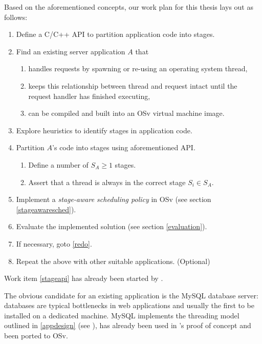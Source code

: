 \documentclass{article}
\begin{document}
Based on the aforementioned concepts, our work plan for this thesis lays out as follows:

\begin{enumerate}
    \item \label{stageapi} Define a C/C++ API to partition application code into stages.
    \item \label{appdesign} Find an existing server application $A$ that
    \begin{enumerate}
        \item handles requests by spawning or re-using an operating system thread,
        \item keeps this relationship between thread and request intact until the request handler has finished executing,
        \item \label{app_osv_image} can be compiled and built into an OSv virtual machine image.
    \end{enumerate}
    \item Explore heuristics to identify stages in application code.
    \item Partition $A$'s code into stages using aforementioned API.
    \begin{enumerate}
        \item Define a number of $S_A \ge 1$ stages.
        \item Assert that a thread is always in the correct stage $S_i \in S_A$.
    \end{enumerate}
    \item \label{redo} Implement a \textit{stage-aware scheduling policy} in OSv (see section \ref{stageawaresched}).
    \item Evaluate the implemented solution (see section \ref{evaluation}).
    \item If necessary, goto \ref{redo}.
    \item Repeat the above with other suitable applications. (Optional)
\end{enumerate}

Work item \ref{stageapi} has already been started by \citeauthor{gottschlag2017}.

The obvious candidate for an existing application is the MySQL database server:
databases are typical bottlenecks in web applications and usually the first to be installed on a dedicated machine.
MySQL implements the threading model outlined in \ref{appdesign} (see \cite{mysqlThreading}),
has already been used in \citeauthor{gottschlag2017}'s proof of concept
and been ported to OSv. \label{willusemysqlfirst}
\end{document}
